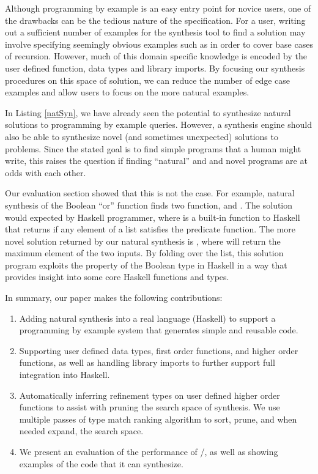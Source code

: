 Although programming by example is an easy entry point for novice
users, one of the drawbacks can be the tedious nature of the
specification.  For a user, writing out a sufficient number of
examples for the synthesis tool to find a solution may involve
specifying seemingly obvious examples such as \codeinline{[]->[]} in
order to cover base cases of recursion.  However, much of this domain
specific knowledge is encoded by the user defined function, data types
and library imports.  By focusing our synthesis procedures on this
space of solution, we can reduce the number of edge case examples and
allow users to focus on the more natural examples.


In Listing \ref{natSyn}, we have already seen the potential to synthesize natural solutions to programming by example queries.
However, a synthesis engine should also be able to synthesize novel (and sometimes unexpected) solutions to problems. 
Since the stated goal is to find simple programs that a human might write, this raises the question if finding ``natural'' and and novel programs are at odds with each other.


Our evaluation section showed that this is not the case.
For example, natural synthesis of the Boolean ``or'' function finds two function,  and .
The  solution would expected by Haskell programmer, where  is a built-in function to Haskell that returns  if any element of a list satisfies the predicate function. 
The more novel solution returned by our natural synthesis is , where  will return the maximum element of the two inputs.
By folding over the list, this solution program exploits the  property of the Boolean type in Haskell in a way that provides insight into some core Haskell functions and types.

In summary, our paper makes the following contributions:

\begin{enumerate}[topsep=0pt]
\item Adding natural synthesis into a real language (Haskell) to support a programming by example system that generates simple and reusable code.
\item Supporting user defined data types, first order functions, and higher order functions, as well as handling library imports to further support full integration into Haskell.
\item Automatically inferring refinement types on user defined higher order functions to assist with pruning the search space of synthesis. We use multiple passes of type match ranking algorithm to sort, prune, and when needed expand, the search space.
\item We present an evaluation of the performance of \ourTool/, as well as showing examples of the code that it can synthesize.
\end{enumerate}
